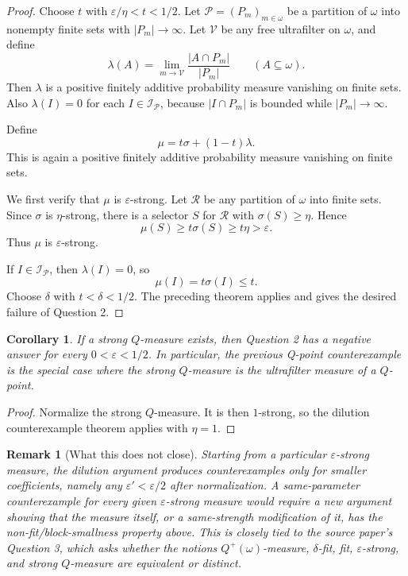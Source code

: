 \documentclass[11pt]{article}
\newtheorem{corollary}{Corollary}
\newtheorem{remark}{Remark}
\begin{document}
\begin{proof}
Choose \(t\) with \(\varepsilon/\eta<t<1/2\).  Let
\(\mathcal P=(P_m)_{m\in\omega}\) be a partition of \(\omega\) into nonempty
finite sets with \(|P_m|\to\infty\).  Let \(\mathcal V\) be any free ultrafilter
on \(\omega\), and define
\[
  \lambda(A)=\lim_{m\to\mathcal V}\frac{|A\cap P_m|}{|P_m|}
  \qquad(A\subseteq\omega).
\]
Then \(\lambda\) is a positive finitely additive probability measure vanishing
on finite sets.  Also \(\lambda(I)=0\) for each \(I\in\mathcal I_{\mathcal P}\),
because \(|I\cap P_m|\) is bounded while \(|P_m|\to\infty\).

Define
\[
  \mu=t\sigma+(1-t)\lambda.
\]
This is again a positive finitely additive probability measure vanishing on
finite sets.

We first verify that \(\mu\) is \(\varepsilon\)-strong.  Let \(\mathcal R\) be
any partition of \(\omega\) into finite sets.  Since \(\sigma\) is
\(\eta\)-strong, there is a selector \(S\) for \(\mathcal R\) with
\(\sigma(S)\ge\eta\).  Hence
\[
  \mu(S)\ge t\sigma(S)\ge t\eta>\varepsilon.
\]
Thus \(\mu\) is \(\varepsilon\)-strong.

If \(I\in\mathcal I_{\mathcal P}\), then \(\lambda(I)=0\), so
\[
  \mu(I)=t\sigma(I)\le t.
\]
Choose \(\delta\) with \(t<\delta<1/2\).  The preceding theorem applies and
gives the desired failure of Question 2.
\end{proof}

\begin{corollary}
If a strong \(Q\)-measure exists, then Question 2 has a negative answer for
every \(0<\varepsilon<1/2\).  In particular, the previous Q-point
counterexample is the special case where the strong \(Q\)-measure is the
ultrafilter measure of a \(Q\)-point.
\end{corollary}

\begin{proof}
Normalize the strong \(Q\)-measure.  It is then \(1\)-strong, so the dilution
counterexample theorem applies with \(\eta=1\).
\end{proof}

\begin{remark}[What this does not close]
Starting from a particular \(\varepsilon\)-strong measure, the dilution argument
produces counterexamples only for smaller coefficients, namely any
\(\varepsilon'<\varepsilon/2\) after normalization.  A same-parameter
counterexample for every given \(\varepsilon\)-strong measure would require a
new argument showing that the measure itself, or a same-strength modification
of it, has the non-fit/block-smallness property above.  This is closely tied
to the source paper's Question 3, which asks whether the notions
\(Q^+(\omega)\)-measure, \(\delta\)-fit, fit, \(\varepsilon\)-strong, and
strong \(Q\)-measure are equivalent or distinct.
\end{remark}
\end{document}
